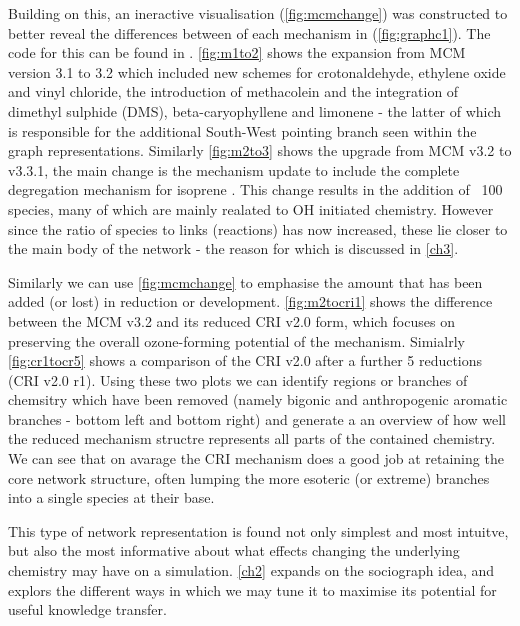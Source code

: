 Building on this, an ineractive visualisation (\autoref{fig:mcmchange}) was constructed to better reveal the differences between of each mechanism in (\autoref{fig:graphc1}). The code for this can be found in \citep{mcmblue}. 
\autoref{fig:m1to2} shows the expansion from MCM version 3.1 to 3.2 which included new schemes for crotonaldehyde, ethylene oxide and vinyl chloride, the introduction of methacolein and the integration of dimethyl sulphide (DMS), beta-caryophyllene and limonene \citep{mcm} - the latter of which is responsible for the additional South-West pointing branch seen within the graph representations. Similarly \autoref{fig:m2to3} shows the upgrade from MCM v3.2 to v3.3.1, the main change is the mechanism update to include the complete degregation mechanism for isoprene \citep{isopmcm}. This change results in the addition of ~100 species, many of which are mainly realated to OH initiated chemistry. However since the ratio of species to links (reactions) has now increased, these lie closer to the main body of the network - the reason for which is discussed in \autoref{ch3}. 

Similarly we can use \autoref{fig:mcmchange} to emphasise the amount that has been added (or lost) in reduction or development. \autoref{fig:m2tocri1} shows the difference between the MCM v3.2 and its reduced CRI v2.0 form, which focuses on preserving the overall ozone-forming potential of the mechanism. Simialrly \autoref{fig:cr1tocr5} shows a comparison of the CRI v2.0 after a further 5 reductions (CRI v2.0 r1). Using these two plots we can identify regions or branches of chemsitry which have been removed (namely bigonic and anthropogenic aromatic branches - bottom left and bottom right) and generate a an overview of how well the reduced mechanism structre represents all parts of the contained chemistry. We can see that on avarage the CRI mechanism does a good job at retaining the core network structure, often lumping the more esoteric (or extreme) branches into a single species at their base.  

This type of network representation is found not only simplest and most intuitve, but also the most informative about what effects changing the underlying chemistry may have on a simulation. \autoref{ch2} expands on the sociograph idea, and explors the different ways in which we may tune it to maximise its potential for useful knowledge transfer. 
    

